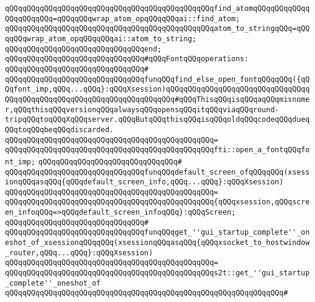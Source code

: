 \verb|qQQqqQQqqQQqqQQqqQQqqQQqqQQqqQQqqQQqqQQqqQQqqQQqfind_atomqQQqqQQqqQQqqQQqqQQqqQQq=qQQqqQQqwrap_atom_opqQQqqQQqai::find_atom;|\newline
\verb|qQQqqQQqqQQqqQQqqQQqqQQqqQQqqQQqqQQqqQQqqQQqqQQqatom_to_stringqQQq=qQQqqQQqwrap_atom_opqQQqqQQqai::atom_to_string;|\newline
\verb|qQQqqQQqqQQqqQQqqQQqqQQqqQQqqQQqend;|\newline
\newline
\verb|qQQqqQQqqQQqqQQqqQQqqQQqqQQqqQQq#qQQqFontqQQqoperations:|\newline
\verb|qQQqqQQqqQQqqQQqqQQqqQQqqQQqqQQq#|\newline
\verb|qQQqqQQqqQQqqQQqqQQqqQQqqQQqqQQqfunqQQqfind_else_open_fontqQQqqQQq({qQQqfont_imp,qQQq...qQQq}:qQQqXsession)qQQqqQQqqQQqqQQqqQQqqQQqqQQqqQQqqQQqqQQqqQQqqQQqqQQqqQQqqQQqqQQqqQQqqQQq#qQQqThisqQQqisqQQqaqQQqmisnomer,qQQqthisqQQqversionqQQqalwaysqQQqopensqQQqitqQQqviaqQQqround-tripqQQqtoqQQqXqQQqserver.qQQqButqQQqthisqQQqisqQQqoldqQQqcodeqQQqdueqQQqtoqQQqbeqQQqdiscarded.|\newline
\verb|qQQqqQQqqQQqqQQqqQQqqQQqqQQqqQQqqQQqqQQqqQQqqQQq=|\newline
\verb|qQQqqQQqqQQqqQQqqQQqqQQqqQQqqQQqqQQqqQQqqQQqqQQqfti::open_a_fontqQQqfont_imp;|\newline
\newline
\verb|qQQqqQQqqQQqqQQqqQQqqQQqqQQqqQQq#|\newline
\verb|qQQqqQQqqQQqqQQqqQQqqQQqqQQqqQQqfunqQQqdefault_screen_ofqQQqqQQq(xsessionqQQqasqQQq{qQQqdefault_screen_info,qQQq...qQQq}:qQQqXsession)|\newline
\verb|qQQqqQQqqQQqqQQqqQQqqQQqqQQqqQQqqQQqqQQqqQQqqQQq=|\newline
\verb|qQQqqQQqqQQqqQQqqQQqqQQqqQQqqQQqqQQqqQQqqQQqqQQq{qQQqxsession,qQQqscreen_infoqQQq=>qQQqdefault_screen_infoqQQq}:qQQqScreen;|\newline
\newline
\verb|qQQqqQQqqQQqqQQqqQQqqQQqqQQqqQQq#|\newline
\verb|qQQqqQQqqQQqqQQqqQQqqQQqqQQqqQQqfunqQQqget_''gui_startup_complete''_oneshot_of_xsessionqQQqqQQq(xsessionqQQqasqQQq{qQQqxsocket_to_hostwindow_router,qQQq...qQQq}:qQQqXsession)|\newline
\verb|qQQqqQQqqQQqqQQqqQQqqQQqqQQqqQQqqQQqqQQqqQQqqQQq=|\newline
\verb|qQQqqQQqqQQqqQQqqQQqqQQqqQQqqQQqqQQqqQQqqQQqqQQqs2t::get_''gui_startup_complete''_oneshot_of|\newline
\verb|qQQqqQQqqQQqqQQqqQQqqQQqqQQqqQQqqQQqqQQqqQQqqQQqqQQqqQQqqQQqqQQq#|\newline
